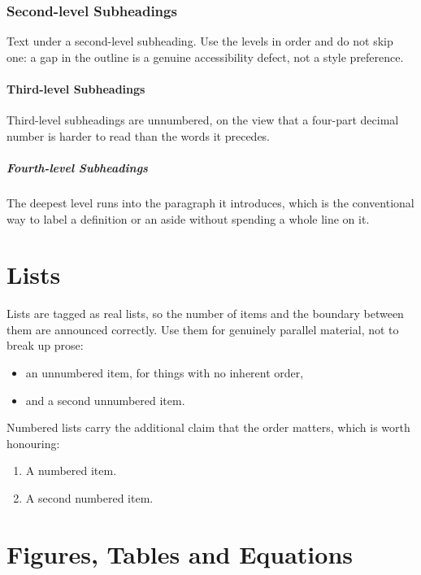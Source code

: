 \subsubsection{Second-level Subheadings}

Text under a second-level subheading. Use the levels in order and do not skip
one: a gap in the outline is a genuine accessibility defect, not a style
preference.

\paragraph{Third-level Subheadings}

Third-level subheadings are unnumbered, on the view that a four-part decimal
number is harder to read than the words it precedes.

\subparagraph{Fourth-level Subheadings} The deepest level runs into the paragraph it
introduces, which is the conventional way to label a definition or an aside
without spending a whole line on it.

\section{Lists}
Lists are tagged as real lists, so the number of items and the boundary
between them are announced correctly. Use them for genuinely parallel
material, not to break up prose:

\begin{itemize}
  \item an unnumbered item, for things with no inherent order,
  \item and a second unnumbered item.
\end{itemize}

Numbered lists carry the additional claim that the order matters, which is
worth honouring:

\begin{enumerate}
  \item A numbered item.
  \item A second numbered item.
\end{enumerate}

\section{Figures, Tables and Equations}
